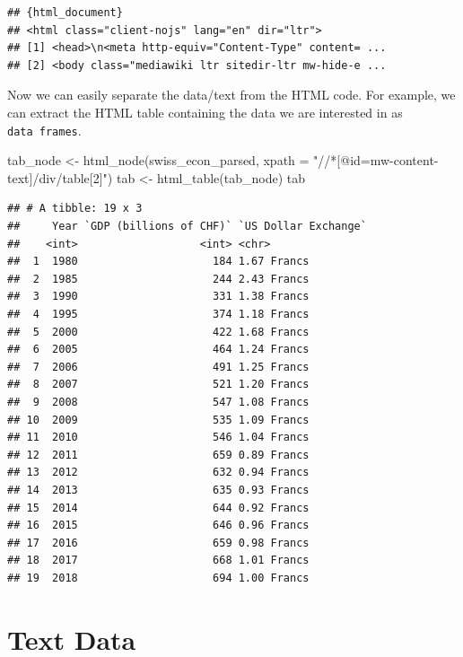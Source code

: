 \documentclass[
  12pt,
]{style/krantz}
\newenvironment{Shaded}{\begin{snugshade}}{\end{snugshade}}
\newcommand{\AttributeTok}[1]{\textcolor[rgb]{0.77,0.63,0.00}{#1}}
\newcommand{\FunctionTok}[1]{\textcolor[rgb]{0.00,0.00,0.00}{#1}}
\newcommand{\NormalTok}[1]{#1}
\newcommand{\OtherTok}[1]{\textcolor[rgb]{0.56,0.35,0.01}{#1}}
\newcommand{\StringTok}[1]{\textcolor[rgb]{0.31,0.60,0.02}{#1}}
\begin{document}
\begin{verbatim}
## {html_document}
## <html class="client-nojs" lang="en" dir="ltr">
## [1] <head>\n<meta http-equiv="Content-Type" content= ...
## [2] <body class="mediawiki ltr sitedir-ltr mw-hide-e ...
\end{verbatim}

Now we can easily separate the data/text from the HTML code. For example, we can extract the HTML table containing the data we are interested in as \texttt{data\ frames}.

\begin{Shaded}
\begin{Highlighting}[]
\NormalTok{tab\_node }\OtherTok{\textless{}{-}} \FunctionTok{html\_node}\NormalTok{(swiss\_econ\_parsed, }\AttributeTok{xpath =} \StringTok{"//*[@id=\textquotesingle{}mw{-}content{-}text\textquotesingle{}]/div/table[2]"}\NormalTok{)}
\NormalTok{tab }\OtherTok{\textless{}{-}} \FunctionTok{html\_table}\NormalTok{(tab\_node)}
\NormalTok{tab}
\end{Highlighting}
\end{Shaded}

\begin{verbatim}
## # A tibble: 19 x 3
##     Year `GDP (billions of CHF)` `US Dollar Exchange`
##    <int>                   <int> <chr>               
##  1  1980                     184 1.67 Francs         
##  2  1985                     244 2.43 Francs         
##  3  1990                     331 1.38 Francs         
##  4  1995                     374 1.18 Francs         
##  5  2000                     422 1.68 Francs         
##  6  2005                     464 1.24 Francs         
##  7  2006                     491 1.25 Francs         
##  8  2007                     521 1.20 Francs         
##  9  2008                     547 1.08 Francs         
## 10  2009                     535 1.09 Francs         
## 11  2010                     546 1.04 Francs         
## 12  2011                     659 0.89 Francs         
## 13  2012                     632 0.94 Francs         
## 14  2013                     635 0.93 Francs         
## 15  2014                     644 0.92 Francs         
## 16  2015                     646 0.96 Francs         
## 17  2016                     659 0.98 Francs         
## 18  2017                     668 1.01 Francs         
## 19  2018                     694 1.00 Francs
\end{verbatim}

\hypertarget{text-data}{%
\chapter{Text Data}\label{text-data}}
\end{document}
